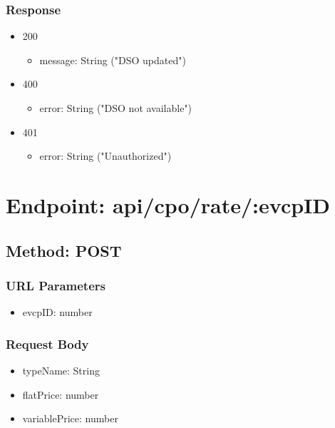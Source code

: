 \subsubsection*{Response}
\begin{itemize}
    \item 200
          \begin{itemize}
              \item message: String ("DSO updated")
          \end{itemize}
    \item 400
          \begin{itemize}
              \item error: String ("DSO not available")
          \end{itemize}
    \item 401
          \begin{itemize}
              \item error: String ("Unauthorized")
          \end{itemize}
\end{itemize}

\section*{Endpoint: api/cpo/rate/:evcpID}
\subsection*{Method: POST}
\subsubsection*{URL Parameters}
\begin{itemize}
    \item evcpID: number
\end{itemize}
\subsubsection*{Request Body}
\begin{itemize}
    \item typeName: String
    \item flatPrice: number
    \item variablePrice: number
\end{itemize}
